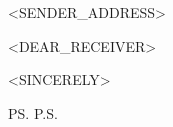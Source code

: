 \documentclass{letter}
\begin{document}
\begin{letter}{<SENDER_ADDRESS>}

\opening{<DEAR_RECEIVER>}

\closing{<SINCERELY>}

\ps{P.S.}

\end{letter}
\end{document}
